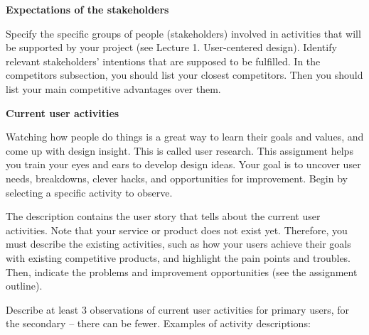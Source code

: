 \documentclass[]{VUMIFTemplateClass}
\begin{document}
\textbf{Expectations of the stakeholders} \checkmark

Specify the specific groups of people (stakeholders) involved in activities that
will be supported by your project (see Lecture 1. User-centered design).
Identify relevant stakeholders' intentions that are supposed to be fulfilled. In
the competitors subsection, you should list your closest competitors. Then you
should list your main competitive advantages over them. \checkmark

\textbf{Current user activities} \checkmark

Watching how people do things is a great way to learn their goals and values,
and come up with design insight. This is called user research. This assignment
helps you train your eyes and ears to develop design ideas. Your goal is to
uncover user needs, breakdowns, clever hacks, and opportunities for improvement.
Begin by selecting a specific activity to observe. \checkmark

The description contains the user story that tells about the current user
activities. Note that your service or product does not exist yet. Therefore, you
must describe the existing activities, such as how your users achieve their
goals with existing competitive products, and highlight the pain points and
troubles. Then, indicate the problems and improvement opportunities (see the
assignment outline). \checkmark

Describe at least 3 observations of current user activities for primary users,
for the secondary – there can be fewer. Examples of activity descriptions: \checkmark
\end{document}
